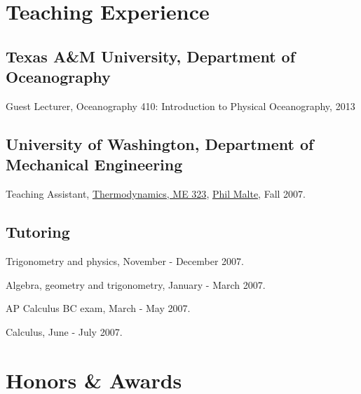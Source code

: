 \documentclass[10pt,letterpaper]{article}
\renewenvironment{itemize}{
  \begin{list}{}{
    \setlength{\leftmargin}{1.5em}
    \setlength{\itemsep}{0.25em}
    \setlength{\parskip}{0pt}
    \setlength{\parsep}{0.25em}
  }
}{
  \end{list}
}
\begin{document}
\section*{Teaching Experience}

\subsection*{Texas A\&M University, Department of Oceanography}

\begin{itemize}

\item Guest Lecturer, Oceanography 410: Introduction to Physical Oceanography, 2013

\end{itemize}

\subsection*{University of Washington, Department of Mechanical Engineering}

\begin{itemize}

\item Teaching Assistant,
  \href{http://www.washington.edu/students/crscat/meche.html#me323}{Thermodynamics, ME 323},
  \href{http://www.me.washington.edu/research/faculty/malte/}{Phil Malte},
  Fall 2007.

\end{itemize}

\subsection*{Tutoring}

\begin{itemize}
	\item Trigonometry and physics, November - December 2007.
	\item Algebra, geometry and trigonometry, January - March 2007.
	\item AP Calculus BC exam, March - May 2007.
	\item Calculus, June - July  2007.
\end{itemize}

\section*{Honors \& Awards}
\end{document}
